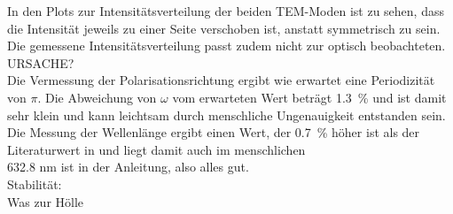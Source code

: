 In den Plots zur Intensitätsverteilung der beiden TEM-Moden ist zu sehen, dass die Intensität jeweils zu einer Seite verschoben ist, anstatt symmetrisch zu sein. Die gemessene Intensitätsverteilung passt zudem nicht zur optisch beobachteten. URSACHE? \\
Die Vermessung der Polarisationsrichtung ergibt wie erwartet eine Periodizität von $\pi$. Die Abweichung von $\omega$ vom erwarteten Wert beträgt \SI{1.3}{\%} und ist damit sehr klein und kann leichtsam durch menschliche Ungenauigkeit entstanden sein. \\
Die Messung der Wellenlänge ergibt einen Wert, der \SI{0.7}{\%} höher ist als der Literaturwert in \cite{V61} und liegt damit auch im menschlichen \\
632.8 nm ist in der Anleitung, also alles gut. \\
Stabilität: \\
Was zur Hölle